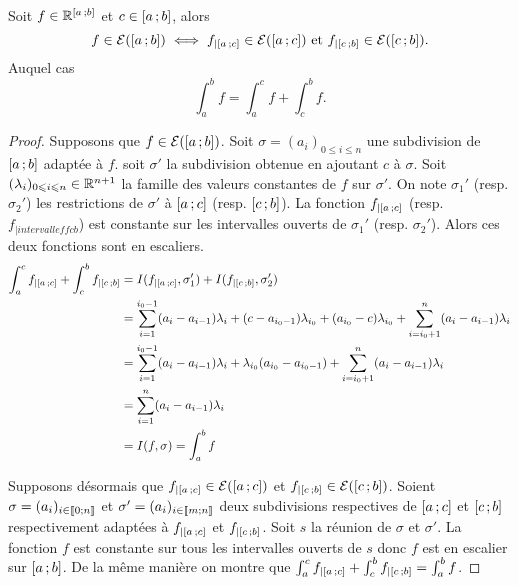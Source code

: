 \begin{prop}
  Soit $f \in \mathbb{R}^{\left[ a \, ;  b \right]}$ et $c \in \left[ a \, ;  b \right]$, alors
  \begin{equation}
    f \in \mathcal{E}(\left[ a \, ;  b \right]) \iff f_{|\left[ a \, ;  c \right]} \in \mathcal{E}(\left[ a \, ;  c \right]) \text{~et~} f_{|\left[ c \, ;  b \right]} \in \mathcal{E}(\left[ c \, ;  b \right]).
  \end{equation}
  Auquel cas
  \begin{equation}
    \int_a^b f = \int_a^c f +\int_c^b f.
  \end{equation}
\end{prop}
\begin{proof}
  Supposons que $f \in \mathcal{E}(\left[ a \, ;  b \right])$. Soit $\sigma=(a_i)_{0\leqslant i \leqslant n}$ une subdivision de $\left[ a \, ;  b \right]$ adaptée à $f$. soit $\sigma'$ la subdivision obtenue en ajoutant $c$ à $\sigma$. Soit $(\lambda_i)_{0 \leqslant i \leqslant n}\in\mathbb{R}^{n+1}$ la famille des valeurs constantes de $f$ sur $\sigma'$. On note $\sigma_1'$ (resp. $\sigma_2'$) les restrictions de $\sigma'$ à $\left[ a \, ;  c \right]$ (resp. $\left[ c \, ;  b \right]$). La fonction $f_{|\left[ a \, ;  c \right]}$ (resp. $f_{|intervalleff{c}{b}}$) est constante sur les intervalles ouverts de $\sigma_1'$ (resp. $\sigma_2'$). Alors ces deux fonctions sont en escaliers.
  \begin{align}
    \int_a^c f_{|\left[ a \, ;  c \right]} +\int_c^b f_{|\left[ c \, ;  b \right]} &= I(f_{|\left[ a \, ;  c \right]},\sigma_1')+I(f_{|\left[ c \, ;  b \right]},\sigma_2') \\
&=\sum_{i=1}^{i_0-1} (a_i-a_{i-1})\lambda_i + (c-a_{i_0-1})\lambda_{i_0} + (a_{i_0}-c)\lambda_{i_0} + \sum_{i=i_0+1}^{n} (a_i-a_{i-1})\lambda_i \\
&= \sum_{i=1}^{i_0-1} (a_i-a_{i-1})\lambda_i + \lambda_{i_0}(a_{i_0}-a_{i_0-1}) +\sum_{i=i_0+1}^{n} (a_i-a_{i-1})\lambda_i\\
&=\sum_{i=1}^{n} (a_i-a_{i-1})\lambda_i\\
&=I(f,\sigma)=\int_a^bf
  \end{align}

  Supposons désormais que $f_{|\left[ a \, ;  c \right]} \in \mathcal{E}(\left[ a \, ;  c \right])$ et $ f_{|\left[ c \, ;  b \right]} \in \mathcal{E}(\left[ c \, ;  b \right])$. Soient $\sigma=(a_i)_{i \in \mathopen{\llbracket}0\mathclose{}\mathpunct{};n\mathclose{\rrbracket}}$ et $\sigma'=(a_i)_{i \in \mathopen{\llbracket}m\mathclose{}\mathpunct{};n\mathclose{\rrbracket}}$ deux subdivisions respectives de $\left[ a \, ;  c \right]$ et $\left[ c \, ;  b \right]$ respectivement adaptées à  $f_{|\left[ a \, ;  c \right]}$ et $ f_{|\left[ c \, ;  b \right]}$. Soit $s$ la réunion de $\sigma$ et $\sigma'$. La fonction $f$ est constante sur tous les intervalles ouverts de $s$ donc $f$ est en escalier sur $\left[ a \, ;  b \right]$. De la même manière on montre que 
$\int_a^c f_{|\left[ a \, ;  c \right]} +\int_c^b f_{|\left[ c \, ;  b \right]} = \int_a^b f$.
\end{proof}

